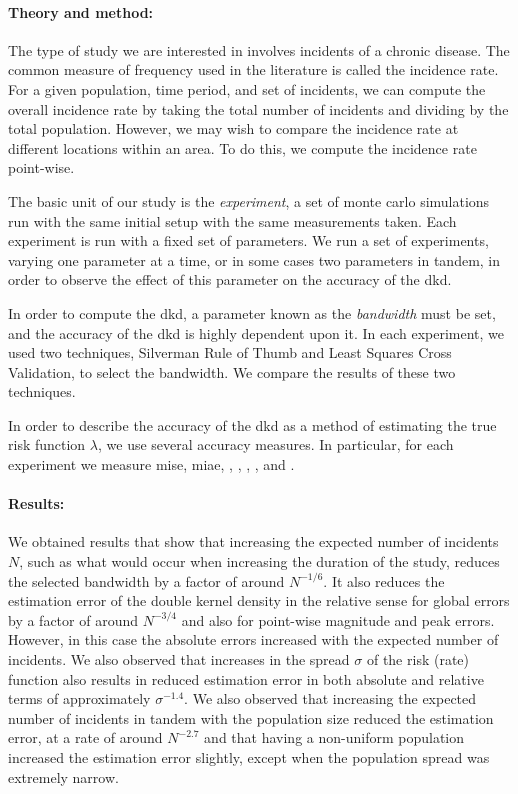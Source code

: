 \begin{onehalfspace}
\paragraph*{Theory and method:}

The type of study we are interested in involves incidents of a chronic disease.
The common measure of frequency used in the literature is called the incidence rate.
For a given population, time period, and set of incidents,
we can compute the overall incidence rate by taking the total number of incidents and dividing by the total population.
However, we may wish to compare the incidence rate at different locations within an area.
To do this, we compute the incidence rate point-wise.

The basic unit of our study is the \textit{experiment},
a set of monte carlo simulations run with the same initial setup with the same measurements taken.
Each experiment is run with a fixed set of parameters.
We run a set of experiments,
varying one parameter at a time, or in some cases two parameters in tandem,
in order to observe the effect of this parameter on the accuracy of the \acrlong{dkd}.

In order to compute the \acrlong{dkd},
a parameter known as the \textit{bandwidth} must be set,
and the accuracy of the \acrlong{dkd} is highly dependent upon it.
In each experiment,
we used two techniques,
Silverman Rule of Thumb and Least Squares Cross Validation,
to select the bandwidth.
We compare the results of these two techniques.

In order to describe the accuracy of the \acrlong{dkd} as a method of estimating the true risk function $\lambda$,
we use several accuracy measures.
In particular,
for each experiment we measure \acrlong{mise},
\acrlong{miae},
,
,
,
,
and .

\paragraph*{Results:}

We obtained results that show that increasing the expected number of incidents $N$,
such as what would occur when increasing the duration of the study,
reduces the selected bandwidth by a factor of around $N^{-1/6}$.
It also reduces the estimation error of the double kernel density in the relative sense
for global errors by a factor of around $N^{-3/4}$ and also for point-wise magnitude and peak errors.
However, in this case the absolute errors increased with the expected number of incidents.
We also observed that increases in the spread $\sigma$ of the risk (rate) function also results in reduced estimation error
in both absolute and relative terms of approximately $\sigma^{-1.4}$.
We also observed that increasing the expected number of incidents in tandem with the population size reduced the estimation error,
at a rate of around $N^{-2.7}$
and that having a non-uniform population increased the estimation error slightly, 
except when the population spread was extremely narrow.


\end{onehalfspace}
